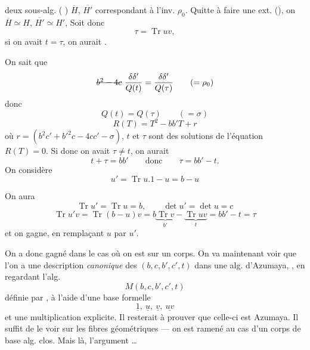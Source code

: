 \documentclass[11pt,a4paper]{article}
\begin{document}
 \ill{} deux sous-alg.  ( ) $\overline{H}$, $\overline{H'}$ correspondant à l'inv. $\rho_0$. Quitte à faire une ext.  (\ill{}), on  $\overline{H}\simeq H$, $\overline{H'}\simeq H'$, \struck{\ill{}}
\struck{\ill{}} Soit donc
\[ \tau = \operatorname{Tr} uv , \]
si on avait $t=\tau$, on aurait .

On sait que
\[ \text{\struck{$b^2-4c$}}\ \frac{\delta\delta'}{Q(t)} = \frac{\delta\delta'}{Q(\tau)} \qquad (=\rho_0) \]
donc
\[ Q(t) = Q(\tau) \qquad (=\sigma) \]
\[ R(T) = T^2 - bb'T + r \]
où $r = (b^2c'+b'^2c-4cc'-\sigma)$, $t$ et $\tau$ sont des solutions de l'équation $R(T)=0$. Si donc on avait $\tau\neq t$, on aurait
\[ t+\tau = bb' \qquad\text{donc}\qquad \tau = bb'-t . \]
On considère
\[ u' = \operatorname{Tr} u.1 - u = b - u \]

On aura
\[ \operatorname{Tr} u' = \operatorname{Tr} u = b , \qquad \det u' = \det u = c \]
\[ \operatorname{Tr} u'v = \operatorname{Tr}(b-u)v = b\underbrace{\operatorname{Tr} v}_{b'} - \underbrace{\operatorname{Tr} uv}_{t} = bb' - t = \tau \]
et on gagne, en remplaçant $u$ par $u'$.

On a donc gagné dans le cas où on est sur un corps. On va maintenant voir que l'on a une description \emph{canonique} des  $(b,c,b',c',t)$ dans une alg. d'Azumaya,  , en regardant l'alg.
\[ M(b,c,b',c',t) \]
définie par , à l'aide d'une base formelle
\[ \underline{1},\ \underline{u},\ \underline{v},\ \underline{uv} \]
et une multiplication explicite. Il resterait à prouver que celle-ci est Azumaya. Il suffit de le voir sur les fibres géométriques --- on est ramené au cas d'un corps de base alg. clos. Mais là, l'argument …
\end{document}
